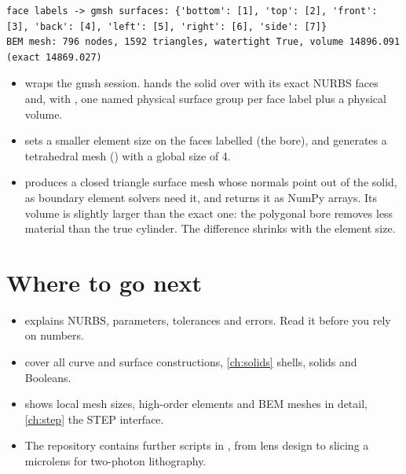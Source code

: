 
\begin{lstlisting}[style=text]
face labels -> gmsh surfaces: {'bottom': [1], 'top': [2], 'front': [3], 'back': [4], 'left': [5], 'right': [6], 'side': [7]}
BEM mesh: 796 nodes, 1592 triangles, watertight True, volume 14896.091 (exact 14869.027)
\end{lstlisting}

\begin{itemize}
  \item {} wraps the gmsh session. 
    hands the solid over with its exact NURBS faces and, with , one
    named physical surface group per face label plus a physical volume.
  \item {} sets a smaller element size on the faces labelled
     (the bore), and  generates a tetrahedral mesh
    () with a global size of 4.
  \item {} produces a closed triangle surface mesh whose normals point out of
    the solid, as boundary element solvers need it, and returns it as NumPy arrays. Its
    volume is slightly larger than the exact one: the polygonal bore removes less material
    than the true cylinder. The difference shrinks with the element size.
\end{itemize}

\section{Where to go next}\label{sec:qs-next}

\begin{itemize}
  \item {} explains NURBS, parameters, tolerances and errors. Read it before
    you rely on numbers.
  \item {} cover all curve and surface constructions,
    \cref{ch:solids} shells, solids and Booleans.
  \item {} shows local mesh sizes, high-order elements and BEM meshes in
    detail, \cref{ch:step} the STEP interface.
  \item The repository contains further scripts in , from lens design to
    slicing a microlens for two-photon lithography.
\end{itemize}
